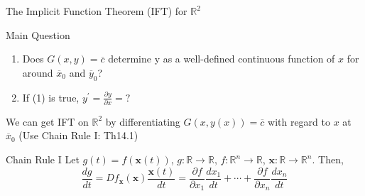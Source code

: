 \documentclass[a4paper,11pt]{article}
\newcommand{\bb}{\mathbb}
\newcommand{\bd}{\mathbf}
\newcommand{\p}{\partial}
\begin{document}
\begin{frame}[t]{The Implicit Function Theorem (IFT) for $\bb{R}^2$}
	\begin{block}
		{Main Question}
		\begin{enumerate}
			\item Does $G(x,y)=\overline c$ determine y as a well-defined continuous function of $x$ for around $\overline x_0$ and $\overline y_0$?
			\item If (1) is true, $y^\prime = \frac{\p y}{\p x}=?$
		\end{enumerate}
	\end{block}
	We can get IFT on $\bb{R}^2$ by differentiating $G(x,y(x))=\overline c$ with regard to $x$ at $\overline x_0$ (Use Chain Rule I: Th14.1)
	\begin{block}
		{Chain Rule I}
		Let $g(t)=f(\bd{x}(t))$, $g:\bb{R}\rightarrow\bb{R}$, $f:\bb{R}^n\rightarrow\bb{R}$, $\bd x :\bb{R}\rightarrow\bb{R}^n$. Then, \[
			\frac{d g}{dt} = Df_{\bd x}(\bd x) \frac {\bd x(t)}{dt} = \frac{\p f}{\p x_1}\frac{dx_1}{dt}+ \cdots +\frac{\p f}{\p x_n}\frac{dx_n}{dt}
		\]
	\end{block}
\end{frame}
\end{document}

